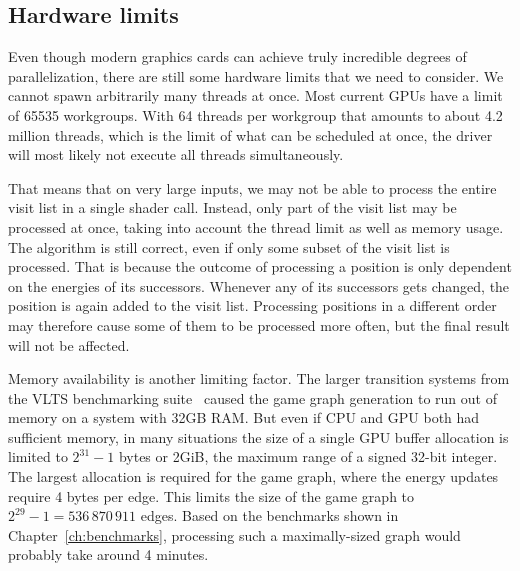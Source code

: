 \subsection{Hardware limits}

Even though modern graphics cards can achieve truly incredible degrees of
parallelization,
there are still some hardware limits that we need to consider.
We cannot spawn arbitrarily many threads at once.
Most current GPUs have a limit of 65535 workgroups.
With 64 threads per workgroup that amounts to about 4.2 million threads,
which is the limit of what can be scheduled at once, the driver will most
likely not execute all threads simultaneously.

That means that on very large inputs,
we may not be able to process the entire visit list in a single shader call.
Instead, only part of the visit list may be processed at once,
taking into account the thread limit as well as memory usage.
The algorithm is still correct,
even if only some subset of the visit list is processed.
That is because the outcome of processing a position is only dependent
on the energies of its successors.
Whenever any of its successors gets changed,
the position is again added to the visit list.
Processing positions in a different order may therefore cause some of them
to be processed more often,
but the final result will not be affected.

Memory availability is another limiting factor.
The larger transition systems from the VLTS benchmarking suite~\cite{vlts}
caused the game graph generation to run out of memory
on a system with 32GB RAM\@.
But even if CPU and GPU both had sufficient memory,
in many situations the size of a single GPU buffer allocation
is limited to $2^{31} - 1$ bytes or 2GiB,
the maximum range of a signed 32-bit integer.
The largest allocation is required for the game graph,
where the energy updates require 4 bytes per edge.
This limits the size of the game graph to
$2^{29} - 1 = 536\,870\,911$ edges.
Based on the benchmarks shown in Chapter~\ref{ch:benchmarks},
processing such a maximally-sized graph would probably take around 4 minutes.
